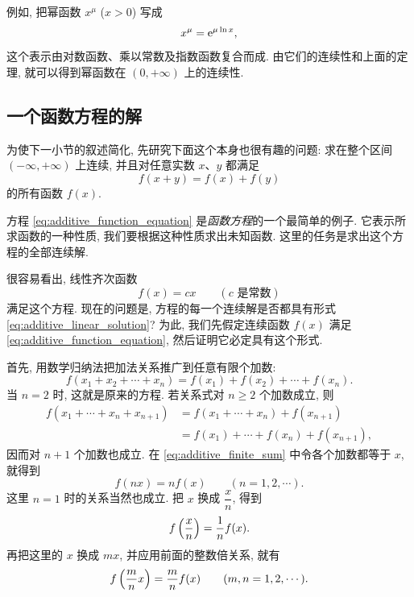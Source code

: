 例如, 把幂函数 $x^\mu$ ($x>0$) 写成
$$
x^\mu=\mathrm{e}^{\mu\ln x},
$$
这个表示由对数函数、乘以常数及指数函数复合而成.
由它们的连续性和上面的定理, 就可以得到幂函数在 $(0,+\infty)$ 上的连续性.

\subsection{一个函数方程的解}\label{subsec:74}
为使下一小节的叙述简化, 先研究下面这个本身也很有趣的问题:
{\kaishu 求在整个区间 $(-\infty,+\infty)$ 上连续, 并且对任意实数 $x$、$y$ 都满足
\begin{equation}\label{eq:additive_function_equation}
f(x+y)=f(x)+f(y)
\tag{A}
\end{equation}
的所有函数 $f(x)$.}

方程 \eqref{eq:additive_function_equation} 是\emph{函数方程}的一个最简单的例子.
它表示所求函数的一种性质, 我们要根据这种性质求出未知函数.
这里的任务是求出这个方程的全部连续解.

很容易看出, 线性齐次函数
\begin{equation}\label{eq:additive_linear_solution}
f(x)=cx\qquad(c\text{ 是常数})
\tag{a}
\end{equation}
满足这个方程.
现在的问题是, 方程的每一个连续解是否都具有形式 \eqref{eq:additive_linear_solution}?
为此, 我们先假定连续函数 $f(x)$ 满足 \eqref{eq:additive_function_equation},
然后证明它必定具有这个形式.

首先, 用数学归纳法把加法关系推广到任意有限个加数:
\begin{equation}\label{eq:additive_finite_sum}
f(x_1+x_2+\cdots+x_n)=f(x_1)+f(x_2)+\cdots+f(x_n).
\end{equation}
当 $n=2$ 时, 这就是原来的方程.
若关系式对 $n\geq2$ 个加数成立, 则
\begin{align*}
f(x_1+\cdots+x_n+x_{n+1})
&=f(x_1+\cdots+x_n)+f(x_{n+1})\\
&=f(x_1)+\cdots+f(x_n)+f(x_{n+1}),
\end{align*}
因而对 $n+1$ 个加数也成立.
在 \eqref{eq:additive_finite_sum} 中令各个加数都等于 $x$, 就得到
\begin{equation}\label{eq:additive_positive_integer_scaling}
f(nx)=nf(x)\qquad(n=1,2,\cdots).
\end{equation}
这里 $n=1$ 时的关系当然也成立.
把 $x$ 换成 $\dfrac{x}{n}$, 得到
$$
f\left( \frac{x}{n} \right)=\frac1n f(x).
$$
再把这里的 $x$ 换成 $mx$, 并应用前面的整数倍关系, 就有
\begin{equation}\label{eq:additive_positive_rational_scaling}
f\left( \frac mn x \right)=\frac mn f(x)\qquad(m,n=1,2,\cdots).
\end{equation}

